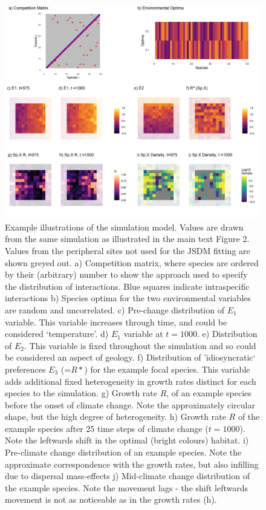 \documentclass[
]{article}
\begin{document}
\begin{figure}
\centering
\includegraphics[width=\textwidth,height=0.65\textheight]{SimulationMarkdowns/Figures/SimulationExample_grid.png}
\caption{Example illustrations of the simulation model. Values are drawn
from the same simulation as illustrated in the main text Figure 2.
Values from the peripheral sites not used for the JSDM fitting are shown
greyed out. a) Competition matrix, where species are ordered by their
(arbitrary) number to show the approach used to specify the distribution
of interactions. Blue squares indicate intraspecific interactions b)
Species optima for the two environmental variables are random and
uncorrelated. c) Pre-change distribution of \(E_1\) variable. This
variable increases through time, and could be considered `temperature'.
d) \(E_1\) variable at \(t=1000\). e) Distribution of \(E_2\). This
variable is fixed throughout the simulation and so could be considered
an aspect of geology. f) Distribution of 'idiosyncratic` preferences
\(E_3\) (=\(R*\)) for the example focal species. This variable adds
additional fixed heterogeneity in growth rates distinct for each species
to the simulation. g) Growth rate \(R\), of an example species before
the onset of climate change. Note the approximately circular shape, but
the high degree of heterogeneity. h) Growth rate \(R\) of the example
species after 25 time steps of climate change (\(t=1000\)). Note the
leftwards shift in the optimal (bright colours) habitat. i) Pre-climate
change distribution of an example species. Note the approximate
correspondence with the growth rates, but also infilling due to
dispersal mass-effects j) Mid-climate change distribution of the example
species. Note the movement lags - the shift leftwards movement is not as
noticeable as in the growth rates (h).}
\end{figure}
\end{document}
